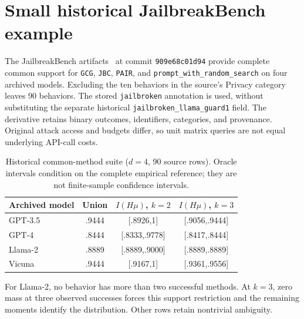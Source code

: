 \documentclass[conference]{IEEEtran}
\begin{document}
\section{Small historical JailbreakBench example}\label{app:jbb}
The JailbreakBench artifacts~\cite{jbb,artifacts} at commit \texttt{909e68c01d94} provide complete common support for \texttt{GCG}, \texttt{JBC}, \texttt{PAIR}, and \texttt{prompt\_with\_random\_search} on four archived models. Excluding the ten behaviors in the source's Privacy category leaves 90 behaviors. The stored \texttt{jailbroken} annotation is used, without substituting the separate historical \texttt{jailbroken\_llama\_guard1} field. The derivative retains binary outcomes, identifiers, categories, and provenance. Original attack access and budgets differ, so unit matrix queries are not equal underlying API-call costs.

\begin{table}[ht]
\caption{Historical common-method suite ($d=4$, 90 source rows). Oracle intervals condition on the complete empirical reference; they are not finite-sample confidence intervals.}\label{tab:jbb}
\centering
\begin{tabular}{lccc}
\toprule
Archived model&Union&$I(H\mu)$, $k=2$&$I(H\mu)$, $k=3$\\
\midrule
GPT-3.5&.9444&[.8926,1]&[.9056,.9444]\\
GPT-4&.8444&[.8333,.9778]&[.8417,.8444]\\
Llama-2&.8889&[.8889,.9000]&[.8889,.8889]\\
Vicuna&.9444&[.9167,1]&[.9361,.9556]\\
\bottomrule
\end{tabular}
\end{table}

For Llama-2, no behavior has more than two successful methods. At $k=3$, zero mass at three observed successes forces this support restriction and the remaining moments identify the distribution. Other rows retain nontrivial ambiguity.
\end{document}
